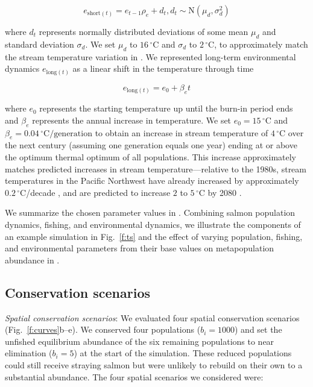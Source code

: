 \[e_{\mathrm{short}(t)} = e_{t-1} \rho_e + d_t, d_t \sim \mathrm{N}(\mu_d, \sigma_d^2)\]

\noindent
where $d_t$ represents normally distributed deviations of some mean $\mu_d$ and standard deviation $\sigma_d$. We set $\mu_d$ to $16\,^{\circ}\mathrm{C}$ and $\sigma_d$ to $2\,^{\circ}\mathrm{C}$, to approximately match the stream temperature variation in \citet{eliason2011}. We represented long-term environmental dynamics $e_{\mathrm{long}(t)}$ as a linear shift in the temperature through time

\[e_{\mathrm{long}(t)} = e_0 + \beta_e t\]

\noindent
where $e_0$ represents the starting temperature up until the burn-in period ends and $\beta_e$ represents the annual increase in temperature. We set $e_0 = 15\,^{\circ}\mathrm{C}$ and $\beta_e = 0.04\,^{\circ}\mathrm{C} / \mathrm{generation}$ to obtain an increase in stream temperature of $4\,^{\circ}\mathrm{C}$ over the next century (assuming one generation equals one year) ending at or above the optimum thermal optimum of all populations. This increase approximately matches predicted increases in stream temperature---relative to the 1980s, stream temperatures in the Pacific Northwest have already increased by approximately $0.2\,^{\circ}\mathrm{C}$/decade \citep{isaak2012}, and are predicted to increase $2$ to $5\,^{\circ}\mathrm{C}$ by 2080 \citep{mantua2010}.

We summarize the chosen parameter values in \somparam. Combining salmon population dynamics, fishing, and environmental dynamics, we illustrate the components of an example simulation in Fig.~\ref{f:ts} and the effect of varying population, fishing, and environmental parameters from their base values on metapopulation abundance in \somsens.

\subsection{Conservation scenarios}\label{conservation-scenarios}

\emph{Spatial conservation scenarios}: We evaluated four spatial conservation scenarios (Fig.~\ref{f:curves}b--e). We conserved four populations ($b_i = 1000$) and set the unfished equilibrium abundance of the six remaining populations to near elimination ($b_i = 5$) at the start of the simulation. These reduced populations could still receive straying salmon but were unlikely to rebuild on their own to a substantial abundance. The four spatial scenarios we considered were:

